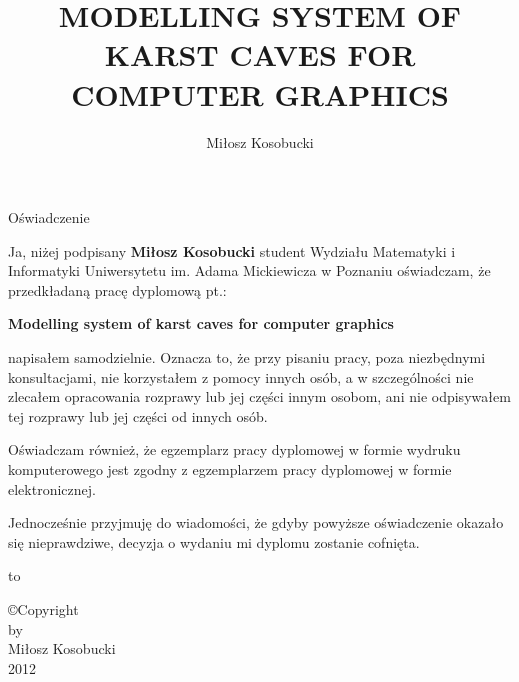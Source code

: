 \documentclass[twoside,openright,a4paper]{memoir}
\begin{document}
\title{MODELLING SYSTEM OF KARST CAVES FOR COMPUTER GRAPHICS}
\author{Miłosz Kosobucki}

\maketitle
\newpage

\begin{center}
  \LARGE{Oświadczenie}
\end{center}

Ja, niżej podpisany \textbf{Miłosz Kosobucki} student Wydziału
Matematyki i Informatyki Uniwersytetu im. Adama Mickiewicza w Poznaniu
oświadczam, że przedkładaną pracę dyplomową pt.:

\textbf{Modelling system of karst caves for computer graphics}

napisałem samodzielnie. Oznacza to, że przy pisaniu pracy, poza niezbędnymi
konsultacjami, nie korzystałem z pomocy innych osób, a w szczególności nie
zlecałem opracowania rozprawy lub jej części innym osobom, ani nie
odpisywałem tej rozprawy lub jej części od innych osób.

Oświadczam również, że egzemplarz pracy dyplomowej w formie wydruku
komputerowego jest zgodny z egzemplarzem pracy dyplomowej w formie
elektronicznej.

Jednocześnie przyjmuję do wiadomości, że gdyby powyższe oświadczenie
okazało się nieprawdziwe, decyzja o wydaniu mi dyplomu zostanie cofnięta.

\newcommand{\kropki}[2]{%
  \vbox{%
    \hbox to #1{\dotfill}%
    \vspace{4pt}%
    \hbox to #1{\hss #2\hss}%
  }
}
\vspace{1cm}
\hbox to \textwidth{%
  \hfil
  \kropki{4cm}{data}%
  \hfil\hfil
  \kropki{4cm}{podpis}%
  \hfil
}%
\newpage

\copyright Copyright\\
by\\
Miłosz Kosobucki\\
2012

\tableofcontents


\end{document}
